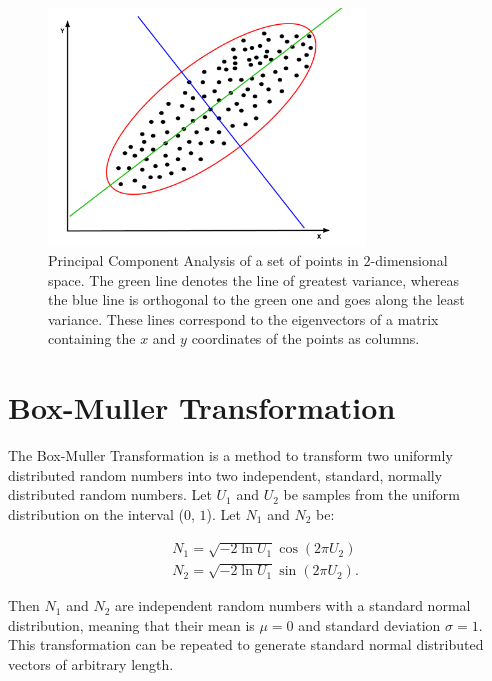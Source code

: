 \begin{figure}
  \centering
  \includegraphics[width=0.75\textwidth]{Images/PCA.pdf}
  \caption{Principal Component Analysis of a set of points in
  $2$-dimensional space. The green line denotes the line of greatest
  variance, whereas the blue line is orthogonal to the green one and
  goes along the least variance. These lines correspond to the
  eigenvectors of a matrix containing the $x$ and $y$ coordinates of the
  points as columns.}
  \label{fig:PCA}
\end{figure}

\section{Box-Muller Transformation}\label{sec:BM}

The Box-Muller Transformation is a method to transform two uniformly
distributed random numbers into two independent, standard, normally
distributed random numbers. Let $U_1$ and $U_2$ be samples from the
uniform distribution on the interval ($0$, $1$). Let $N_1$ and $N_2$ be:

\begin{align}
  &N_1 = \sqrt{-2 \ln{U_1}} \cos (2 \pi U_2) \\
  &N_2 = \sqrt{-2 \ln{U_1}} \sin (2 \pi U_2).
\end{align}

\noindent Then $N_1$ and $N_2$ are independent random numbers with a
standard normal distribution, meaning that their mean is $\mu = 0$ and
standard deviation $\sigma = 1$. This transformation can be repeated to
generate standard normal distributed vectors of arbitrary length.

